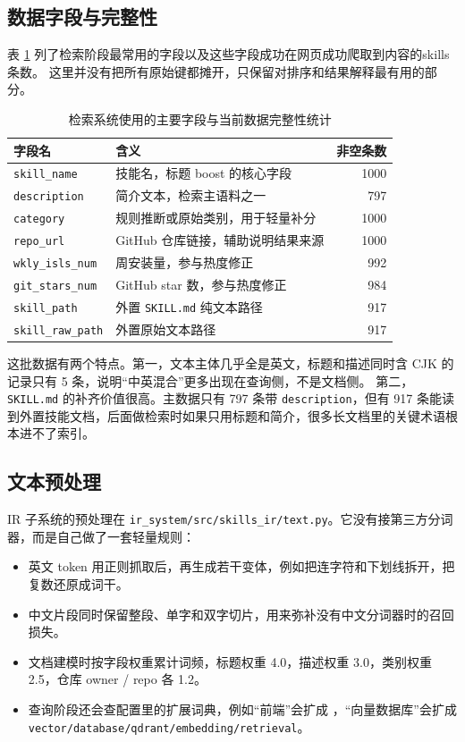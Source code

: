 \subsection{数据字段与完整性}
表 \ref{tab:data-fields} 列了检索阶段最常用的字段以及这些字段成功在网页成功爬取到内容的skills条数。
这里并没有把所有原始键都摊开，只保留对排序和结果解释最有用的部分。

\begin{table}[H]
\centering
\caption{检索系统使用的主要字段与当前数据完整性统计}
\label{tab:data-fields}
\begin{tabular}{p{3.2cm}p{7.0cm}r}
\toprule
字段名 & 含义 & 非空条数 \\
\midrule
\texttt{skill\_name} & 技能名，标题 boost 的核心字段 & 1000 \\
\texttt{description} & 简介文本，检索主语料之一 & 797 \\
\texttt{category} & 规则推断或原始类别，用于轻量补分 & 1000 \\
\texttt{repo\_url} & GitHub 仓库链接，辅助说明结果来源 & 1000 \\
\texttt{wkly\_isls\_num} & 周安装量，参与热度修正 & 992 \\
\texttt{git\_stars\_num} & GitHub star 数，参与热度修正 & 984 \\
\texttt{skill\_path} & 外置 \texttt{SKILL.md} 纯文本路径 & 917 \\
\texttt{skill\_raw\_path} & 外置原始文本路径 & 917 \\
\bottomrule
\end{tabular}
\end{table}

这批数据有两个特点。第一，文本主体几乎全是英文，标题和描述同时含 CJK 的记录只有 5 条，说明“中英混合”更多出现在查询侧，不是文档侧。
第二，\texttt{SKILL.md} 的补齐价值很高。主数据只有 797 条带 \texttt{description}，但有 917 条能读到外置技能文档，后面做检索时如果只用标题和简介，很多长文档里的关键术语根本进不了索引。

\subsection{文本预处理}
IR 子系统的预处理在 \texttt{ir\_system/src/skills\_ir/text.py}。它没有接第三方分词器，而是自己做了一套轻量规则：
\begin{itemize}
  \item 英文 token 用正则抓取后，再生成若干变体，例如把连字符和下划线拆开，把复数还原成词干。
  \item 中文片段同时保留整段、单字和双字切片，用来弥补没有中文分词器时的召回损失。
  \item 文档建模时按字段权重累计词频，标题权重 4.0，描述权重 3.0，类别权重 2.5，仓库 owner / repo 各 1.2。
  \item 查询阶段还会查配置里的扩展词典，例如“前端”会扩成 ，“向量数据库”会扩成 \texttt{vector/database/qdrant/embedding/retrieval}。
\end{itemize}

